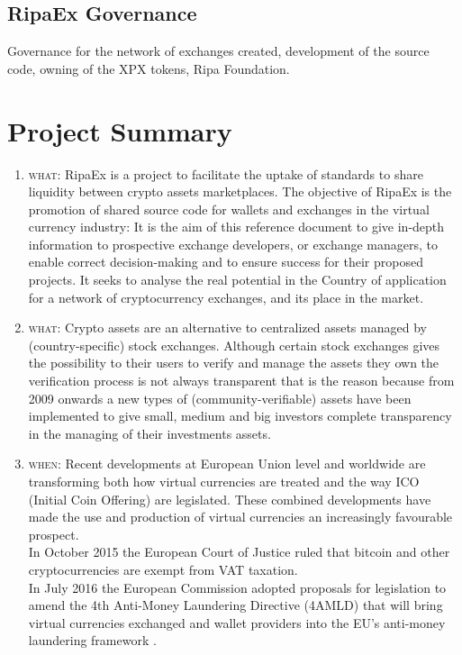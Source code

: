 \documentclass[11pt,fleqn,oneside]{book} %
\begin{document}
\subsection{RipaEx Governance}
Governance for the network of exchanges created, development of the source code, owning of the XPX tokens, Ripa Foundation.

\section{Project Summary}
\begin{enumerate}
	\item \textsc{what}: RipaEx is a project to facilitate the uptake of standards to share liquidity between crypto assets marketplaces. 
	The objective of RipaEx is the promotion of shared source code for wallets and exchanges in the virtual currency industry: 
	It is the aim of this reference document to give in-depth information to prospective exchange developers,
	or exchange managers, to enable correct decision-making and to ensure success for their proposed projects. 
	It seeks to analyse the real potential in the Country of application for a network of cryptocurrency exchanges, 
	and its place in the market.
	\item \textsc{what}: Crypto assets are an alternative to centralized assets managed by (country-specific) stock exchanges. Although certain
	stock exchanges gives the possibility to their users to verify and manage the assets they own the verification process
	is not always transparent that is the reason because from 2009 \cite{bitcoin} onwards a new types of (community-verifiable) assets 
	have been implemented to give small, medium and big investors complete transparency in the managing of their investments
	assets.
	\item \textsc{when}: Recent developments at European Union level and worldwide are transforming both how virtual currencies
	are treated and the way ICO (Initial Coin Offering) are legislated. These combined developments 
	have made the use and production of virtual currencies an increasingly favourable prospect. \\
	In October 2015 the European Court of Justice ruled that bitcoin and other cryptocurrencies are exempt from VAT taxation. \\
	In July 2016 the European Commission adopted proposals for legislation to amend the 4th Anti-Money Laundering Directive (4AMLD) that
	will bring virtual currencies exchanged and wallet providers into the EU's anti-money laundering framework \cite{EUAMLCrypto}.\\

\end{enumerate}
\end{document}
